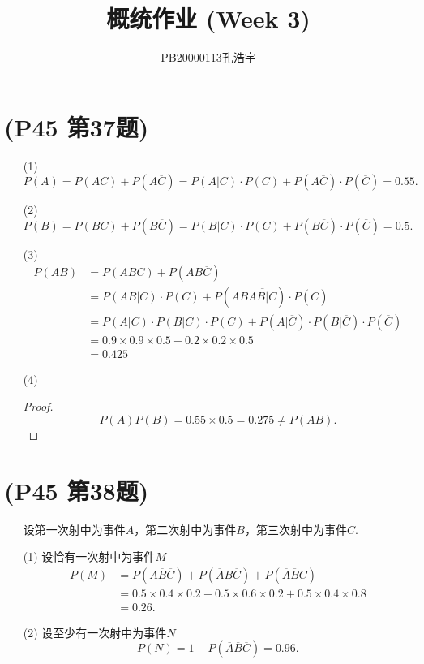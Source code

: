 \documentclass{article}
\title{概统作业 (Week 3)}
\author{PB20000113孔浩宇}
\begin{document}
\maketitle
\section{(P45 第37题)}  %
\begin{enumerate}
    \item [(1)]
    \[
        P(A)=
        P(AC)+P(A\overline{C})
        =P(A|C)\cdot P(C) + P(A\overline{C})\cdot P(\overline{C})
        =0.55 .
    \]
    \item [(2)]
    \[
        P(B)=  
        P(BC)+P(B\overline{C})
        =P(B|C)\cdot P(C) + P(B\overline{C})\cdot P(\overline{C})
        =0.5 .
    \]
    \item [(3)]
    \begin{align*}
        P(AB)
        & =
        P(ABC) + P(AB\overline{C})\\
        & =
        P(AB|C)\cdot P(C) + P(AB\overline{AB|\overline{C}})\cdot P(\overline{C})\\
        & =
        P(A|C)\cdot P(B|C)\cdot P(C) + P(A|\overline{C})\cdot P(B|\overline{C})\cdot P(\overline{C})\\\
        & =
        0.9\times 0.9\times 0.5 + 0.2\times 0.2 \times 0.5\\
        & =
        0.425 
    \end{align*}
    \item [(4)]
    \begin{proof}
        \[
            P(A)P(B)=
            0.55\times 0.5 
            =0.275
            \neq P(AB).    
        \]
    \end{proof}
\end{enumerate}

\section{(P45 第38题)}  %
\begin{enumerate}
    \item []设第一次射中为事件$A$，第二次射中为事件$B$，第三次射中为事件$C$.
    \item [(1)]设恰有一次射中为事件$M$
    \begin{align*}
        P(M)
        & = 
        P(A \overline{B} \overline{C})+ P(\overline{A} B \overline{C})+ P(\overline{A}\overline{B}C)\\
        & =
        0.5\times 0.4\times 0.2 + 0.5\times 0.6\times 0.2 + 0.5\times 0.4\times 0.8\\
        & =
        0.26.
    \end{align*}
    \item [(2)]设至少有一次射中为事件$N$
    \[
        P(N) = 1- P(\overline{A} \overline{B} \overline{C})
        = 0.96.
    \]
\end{enumerate}
\end{document}
